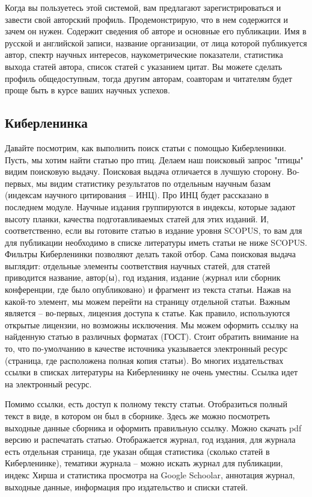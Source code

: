 \documentclass{report}
\begin{document}
Когда вы пользуетесь этой системой, вам предлагают зарегистрироваться  и завести свой авторский профиль. Продемонстрирую, что в нем содержится и зачем он нужен. Содержит сведения об авторе и основные его публикации. Имя в русской и английской записи, название организации, от лица которой публикуется автор, спектр научных интересов, наукометрические показатели, статистика выхода статей автора, список статей с указанием цитат. Вы можете сделать профиль общедоступным, тогда другим авторам, соавторам и читателям будет проще быть в курсе ваших научных успехов.

\subsection{Киберленинка}
Давайте посмотрим, как выполнить поиск статьи с помощью Киберленинки. Пусть, мы хотим найти статью про птиц. Делаем наш поисковый запрос "птицы"  видим поисковую выдачу. Поисковая выдача отличается в лучшую сторону. Во-первых, мы видим статистику результатов по отдельным научным базам (индексам научного цитирования -- ИНЦ). Про ИНЦ будет рассказано в последнем модуле. Научные издания группируются в индексы, которые задают высоту планки, качества подготавливаемых статей для этих изданий. И, соответственно, если вы готовите статью в издание уровня SCOPUS, то вам для для публикации необходимо в списке литературы иметь статьи не ниже SCOPUS. Фильтры Киберленинки позволяют делать такой отбор. Сама поисковая выдача выглядит: отдельные элементы соответствия научных статей, для статей приводится название, автор(ы), год издания, издание (журнал или сборник конференции, где было опубликовано) и фрагмент из текста статьи. Нажав на какой-то элемент, мы можем перейти на страницу отдельной статьи. Важным является -- во-первых, лицензия доступа к статье. Как правило, используются открытые лицензии, но возможны исключения. Мы можем оформить ссылку на найденную статью в различных форматах (ГОСТ). Стоит обратить внимание на то, что по-умолчанию в качестве источника указывается электронный ресурс (страница, где расположена полная копия статьи). Во многих издательствах ссылки в списках литературы на Киберленинку не очень уместны. Ссылка идет на электронный ресурс.

Помимо ссылки, есть доступ к полному тексту статьи. Отобразиться полный текст в виде, в котором он был в сборнике. Здесь же можно посмотреть выходные данные сборника и оформить правильную ссылку. Можно скачать pdf версию и распечатать статью. Отображается журнал, год издания, для журнала есть отдельная страница, где указан общая статистика (сколько статей в Киберленинке), тематики журнала -- можно искать журнал для публикации, индекс Хирша и статистика просмотра на Google Schoolar, аннотация журнал, выходные данные, информация про издательство и списки статей.  
\end{document}
